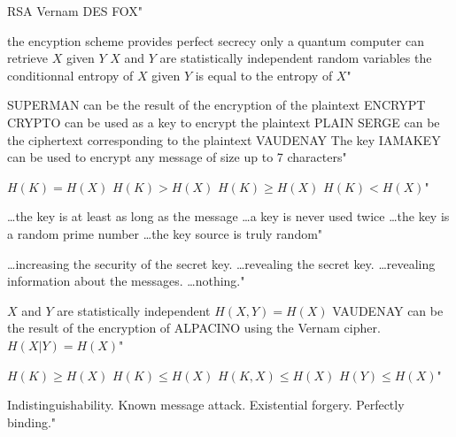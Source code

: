 {RSA}
{Vernam}
{DES}
{FOX"}

{the encyption scheme provides perfect secrecy}
{only a quantum computer can retrieve $X$ given $Y$}
{$X$ and $Y$ are statistically independent random variables}
{the conditionnal entropy of $X$ given $Y$ is equal to the entropy of $X$"}

{SUPERMAN can be the result of the encryption of the plaintext ENCRYPT}
{CRYPTO can be used as a key to encrypt the plaintext PLAIN}
{SERGE can be the ciphertext corresponding to the plaintext VAUDENAY}
{The key IAMAKEY can be used to encrypt any message of size up to 7 characters"}

{$H(K)=H(X)$}
{$H(K)>H(X)$}
{$H(K)\geq H(X)$}
{$H(K)< H(X)$"}

{\ldots the key is at least as long as the message}
{\ldots a key is never used twice}
{\ldots the key is a random prime number}
{\ldots the key source is truly random"}

{\ldots increasing the security of the secret key.}
{\ldots revealing the secret key.}
{\ldots revealing information about the messages.}
{\ldots nothing."}

{$X$ and $Y$ are statistically independent}
{$H(X,Y)=H(X)$}
{VAUDENAY can be the result of the encryption of ALPACINO using the Vernam cipher.}
{$H(X|Y)=H(X)$"}

{$H(K) \geq H(X)$}
{$H(K) \leq H(X)$}
{$H(K,X) \leq H(X)$}
{$H(Y) \leq H(X)$"}

{Indistinguishability.}
{Known message attack.}
{Existential forgery.}
{Perfectly binding."}

